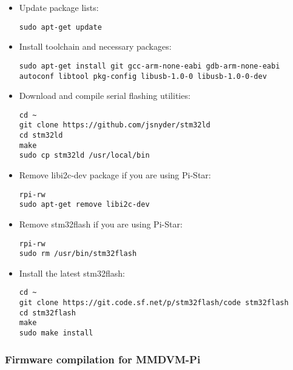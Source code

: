 \documentclass[]{article}
\begin{document}
\begin{itemize}[leftmargin=*]
	
\item Update package lists:
\begin{lstlisting}[style=DOS]
sudo apt-get update
\end{lstlisting}

\item Install toolchain and necessary packages:
\begin{lstlisting}[style=DOS]
sudo apt-get install git gcc-arm-none-eabi gdb-arm-none-eabi autoconf libtool pkg-config libusb-1.0-0 libusb-1.0-0-dev
\end{lstlisting}

\item Download and compile serial flashing utilities:
\begin{lstlisting}[style=DOS]
cd ~
git clone https://github.com/jsnyder/stm32ld
cd stm32ld
make
sudo cp stm32ld /usr/local/bin
\end{lstlisting}

\item Remove libi2c-dev package if you are using Pi-Star:
\begin{lstlisting}[style=DOS]
rpi-rw
sudo apt-get remove libi2c-dev
\end{lstlisting}

\item Remove stm32flash if you are using Pi-Star:
\begin{lstlisting}[style=DOS]
rpi-rw
sudo rm /usr/bin/stm32flash
\end{lstlisting}

\item Install the latest stm32flash:
\begin{lstlisting}[style=DOS]
cd ~
git clone https://git.code.sf.net/p/stm32flash/code stm32flash
cd stm32flash
make
sudo make install
\end{lstlisting}

\end{itemize}

\subsubsection{Firmware compilation for MMDVM-Pi}
\end{document}
